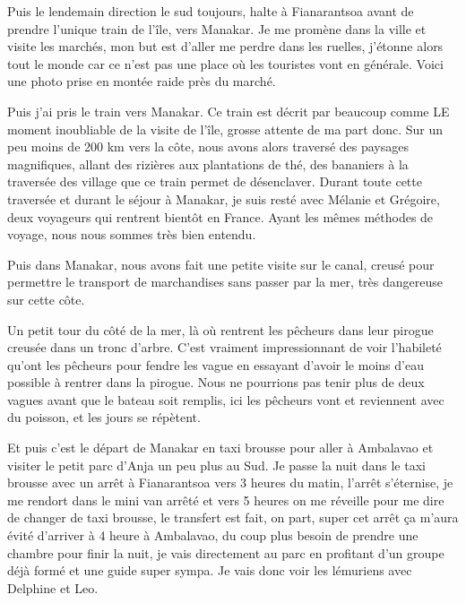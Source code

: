\begin{multicols}{2}

Puis le lendemain direction le sud toujours, halte à Fianarantsoa avant de prendre l'unique train de l'île, vers Manakar. Je me promène dans la ville et visite les marchés, mon but est d'aller me perdre dans les ruelles, j'étonne alors tout le monde car ce n'est pas une place où les touristes vont en générale. Voici une photo prise en montée raide près du marché.


Puis j'ai pris le train vers Manakar. Ce train est décrit par beaucoup comme LE moment inoubliable de la visite de l'île, grosse attente de ma part donc. Sur un peu moins de 200 km vers la côte, nous avons alors traversé des paysages magnifiques, allant des rizières aux plantations de thé, des bananiers à la traversée des village que ce train permet de désenclaver. Durant toute cette traversée et durant le séjour à Manakar, je suis resté avec Mélanie et Grégoire, deux voyageurs qui rentrent bientôt en France. Ayant les mêmes méthodes de voyage, nous nous sommes très bien entendu.


Puis dans Manakar, nous avons fait une petite visite sur le canal, creusé pour permettre le transport de marchandises sans passer par la mer, très dangereuse sur cette côte.


Un petit tour du côté de la mer, là où rentrent les pêcheurs dans leur pirogue creusée dans un tronc d'arbre. C'est vraiment impressionnant de voir l'habileté qu'ont les pêcheurs pour fendre les vague en essayant d'avoir le moins d'eau possible à rentrer dans la pirogue. Nous ne pourrions pas tenir plus de deux vagues avant que le bateau soit remplis, ici les pêcheurs vont et reviennent avec du poisson, et les jours se répètent.


Et puis c'est le départ de Manakar en taxi brousse pour aller à Ambalavao et visiter le petit parc d'Anja un peu plus au Sud. Je passe la nuit dans le taxi brousse avec un arrêt à Fianarantsoa vers 3 heures du matin, l'arrêt s'éternise, je me rendort dans le mini van arrêté et vers 5 heures on me réveille pour me dire de changer de taxi brousse, le transfert est fait, on part, super cet arrêt ça m'aura évité d'arriver à 4 heure à Ambalavao, du coup plus besoin de prendre une chambre pour finir la nuit, je vais directement au parc en profitant d'un groupe déjà formé et une guide super sympa. Je vais donc voir les lémuriens avec Delphine et Leo.


\end{multicols}
